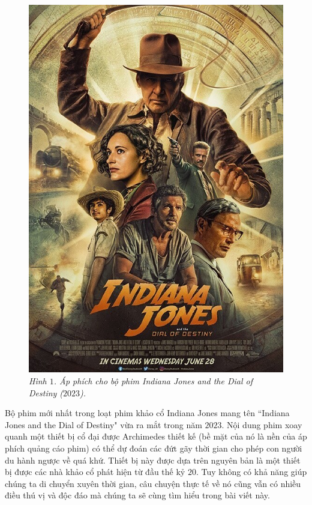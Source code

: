 \begin{multicols}{2}
	\begin{figure}[H]
		\vspace*{5pt}
		\centering
		\captionsetup{labelformat= empty, justification=centering}
		\includegraphics[width= 1\linewidth]{1}
		\caption{\small\textit{\color{lichsutoanhoc}Hình $1$. Áp phích cho bộ phim Indiana Jones and the Dial of Destiny ($2023$).}}
		\vspace*{-10pt}
	\end{figure}
	Bộ phim mới nhất trong loạt phim khảo cổ Indiana Jones mang tên ``Indiana Jones and the Dial of Destiny" vừa ra mắt trong năm $2023$. Nội dung phim xoay quanh một thiết bị cổ đại được Archimedes thiết kế (bề mặt của nó là nền của áp phích quảng cáo phim) có thể dự đoán các đứt gãy thời gian cho phép con người du hành ngược về quá khứ. Thiết bị này được dựa trên nguyên bản là một thiết bị được các nhà khảo cổ phát hiện từ đầu thế kỷ $20$. Tuy không có khả năng giúp chúng ta di chuyển xuyên thời gian, câu chuyện thực tế về nó cũng vẫn có nhiều điều thú vị và độc đáo mà chúng ta sẽ cùng tìm hiểu trong bài viết này.

\end{multicols}
